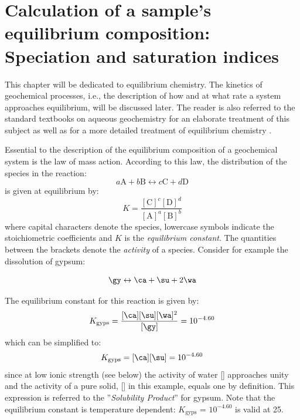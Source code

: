 \chapter{Calculation of a sample's equilibrium composition: Speciation and saturation indices}
\def\shorttitle{Speciation and saturation indices} %

This chapter will be dedicated to equilibrium chemistry. The kinetics of geochemical processes, i.e., the description of how and at what rate a system approaches equilibrium, will be discussed later. The reader is also referred to the standard textbooks on aqueous geochemistry for an elaborate treatment of this subject as well as for a more detailed treatment of equilibrium chemistry \citep[e.g.][]{ap2005, stumorg}.

Essential to the description of the equilibrium composition of a geochemical system is the law of mass action. According to this law, the distribution of the species in the reaction:
\begin{equation}
a\text{A} + b\text{B} \leftrightarrow c\text{C} + d\text{D}
\end{equation}
is given at equilibrium by:
\begin{equation}
K = \frac{[\text{C}]^c[\text{D}]^d}{[\text{A}]^a[\text{B}]^b}
\label{eq:massaction}
\end{equation}
where capital characters denote the species, lowercase symbols indicate the stoichiometric coefficients and $K$ is the \textit{equilibrium constant}. The quantities between the brackets denote the \textit{activity} of a species. Consider for example the dissolution of gypsum:

\begin{equation}
\gy \leftrightarrow \ca + \su + 2\wa
\end{equation}

The equilibrium constant for this reaction is given by:
\begin{equation}
K_\text{gyps} = \frac{[\ca][\su][\wa]^2}{[\gy]} = 10^{-4.60}
\end{equation}
which can be simplified to:
\begin{equation}
K_\text{gyps} = [\ca][\su] = 10^{-4.60}
\label{eq:k_gyps}
\end{equation}
since at low ionic strength (see below) the activity of water [\wa] approaches unity and the activity of a pure solid, [\gy] in this example, equals one by definition. This expression is referred to the ''\textit{Solubility Product}'' for gypsum. Note that the equilibrium constant is temperature dependent:
$K_\text{gyps}$ = $10^{-4.60}$
is valid at \unit{25}{\celsius}.

